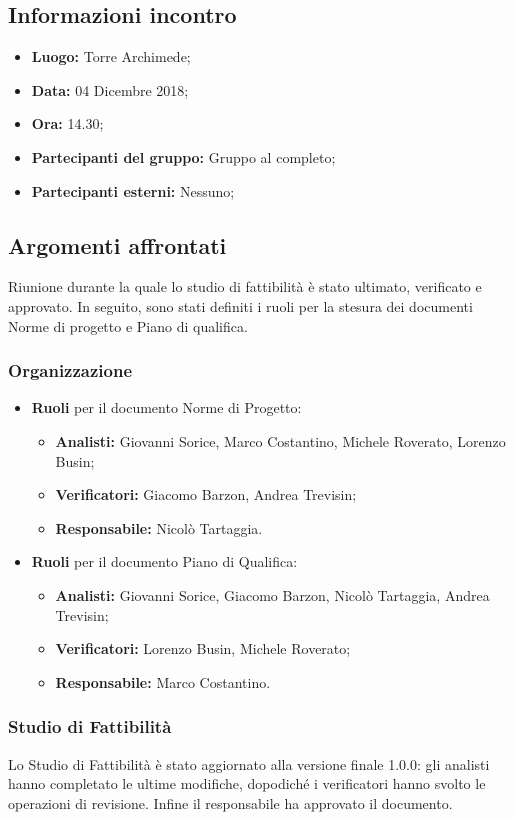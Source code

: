 \subsection{Informazioni incontro}
\begin{itemize}
	\item { \textbf{Luogo:} Torre Archimede;  }
	\item { \textbf{Data:} 04 Dicembre 2018; }
	\item { \textbf{Ora:} 14.30; }
	\item { \textbf{Partecipanti del gruppo:} Gruppo al completo; }
	\item { \textbf{Partecipanti esterni:} Nessuno; }
\end{itemize}


\subsection{Argomenti affrontati}
Riunione durante la quale lo studio di fattibilità è stato ultimato, verificato e approvato. In seguito, sono stati definiti i ruoli per la stesura dei documenti Norme di progetto e Piano di qualifica.

\subsubsection{Organizzazione}
\begin{itemize}
	\item { \textbf{Ruoli} per il documento Norme di Progetto:} 
	\begin{itemize}
		\item { \textbf{Analisti:} Giovanni Sorice, Marco Costantino, Michele Roverato, Lorenzo Busin;}
		\item { \textbf{Verificatori:} Giacomo Barzon, Andrea Trevisin;}
		\item { \textbf{Responsabile:} Nicolò Tartaggia.} \\
	\end{itemize}
	\item { \textbf{Ruoli} per il documento Piano di Qualifica:} 
	\begin{itemize}
		\item { \textbf{Analisti:} Giovanni Sorice, Giacomo Barzon, Nicolò Tartaggia, Andrea Trevisin;}
		\item { \textbf{Verificatori:} Lorenzo Busin, Michele Roverato;}
		\item { \textbf{Responsabile:} Marco Costantino.}
	\end{itemize}
\end{itemize}

\subsubsection{Studio di Fattibilità}
Lo Studio di Fattibilità è stato aggiornato alla versione finale 1.0.0: gli analisti hanno completato le ultime modifiche, dopodiché i verificatori hanno svolto le operazioni di revisione. Infine il responsabile ha approvato il documento.
